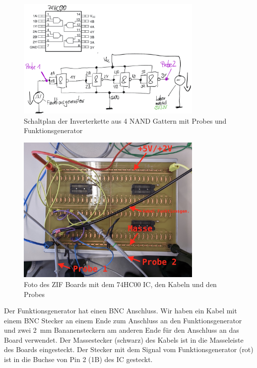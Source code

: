 \documentclass[paper=a4,oneside,abstract,DIV=19,parskip=half]{scrartcl}
\begin{document}
\begin{figure}[!htb]
\begin{center}
\includegraphics[width=0.8\textwidth]{schaltplan}
\end{center}
\caption{Schaltplan der Inverterkette aus 4 NAND Gattern mit Probes und Funktionsgenerator}
\label{fig:schaltplan}
\end{figure}

\begin{figure}[!htb]
\begin{center}
\includegraphics[width=0.8\textwidth]{board}
\end{center}
\caption{Foto des ZIF Boards mit dem 74HC00 IC, den Kabeln und den Probes}
\label{fig:zifboard}
\end{figure}

Der Funktionsgenerator hat einen BNC Anschluss. Wir haben ein Kabel mit einem BNC Stecker an einem Ende zum Anschluss an den Funktionsgenerator und zwei \SI{2}{\mm} Bananensteckern am anderen Ende für den Anschluss an das Board verwendet. Der Massestecker (schwarz) des Kabels ist in die Masseleiste des Boards eingesteckt. Der Stecker mit dem Signal vom Funktionsgenerator (rot) ist in die Buchse von Pin 2 (1B) des IC gesteckt. 
\end{document}
